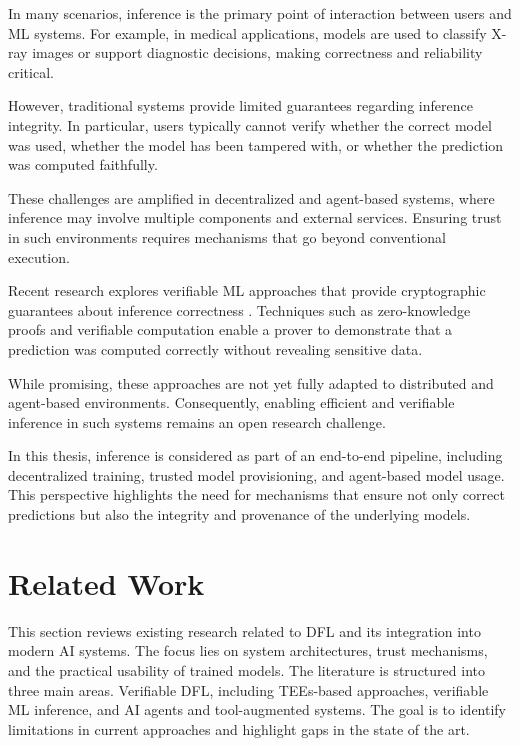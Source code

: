 In many scenarios, inference is the primary point of interaction between users and \ac{ML} systems. For example, in medical applications, models are used to classify X-ray images or support diagnostic decisions, making correctness and reliability critical.

However, traditional systems provide limited guarantees regarding inference integrity. In particular, users typically cannot verify whether the correct model was used, whether the model has been tampered with, or whether the prediction was computed faithfully.

These challenges are amplified in decentralized and agent-based systems, where inference may involve multiple components and external services. Ensuring trust in such environments requires mechanisms that go beyond conventional execution.

Recent research explores verifiable \ac{ML} approaches that provide cryptographic guarantees about inference correctness \cite{10.1145/3627703.3650088, south2024verifiableevaluationsmachinelearning}. Techniques such as zero-knowledge proofs and verifiable computation enable a prover to demonstrate that a prediction was computed correctly without revealing sensitive data.

While promising, these approaches are not yet fully adapted to distributed and agent-based environments. Consequently, enabling efficient and verifiable inference in such systems remains an open research challenge.

In this thesis, inference is considered as part of an end-to-end pipeline, including decentralized training, trusted model provisioning, and agent-based model usage. This perspective highlights the need for mechanisms that ensure not only correct predictions but also the integrity and provenance of the underlying models.
\newpage

\section{Related Work}

This section reviews existing research related to \ac{DFL} and its integration into modern \ac{AI} systems. The focus lies on system architectures, trust mechanisms, and the practical usability of trained models. The literature is structured into three main areas. Verifiable \ac{DFL}, including \acp{TEE}-based approaches, verifiable \ac{ML} inference, and \ac{AI} agents and tool-augmented systems. The goal is to identify limitations in current approaches and highlight gaps in the state of the art.

